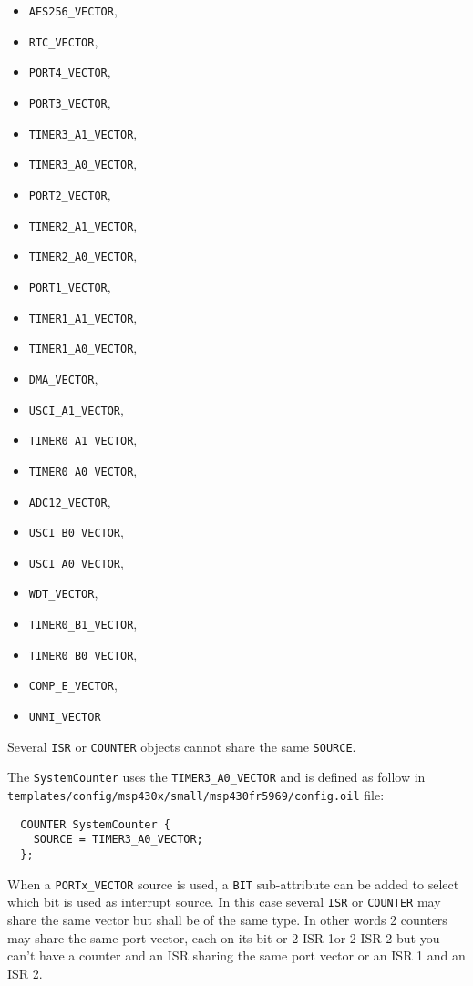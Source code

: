 \documentclass[11pt, oneside]{article}   	%
\begin{document}
\begin{itemize}[noitemsep]
\item \lstinline{AES256_VECTOR},
\item \lstinline{RTC_VECTOR},
\item \lstinline{PORT4_VECTOR},
\item \lstinline{PORT3_VECTOR},
\item \lstinline{TIMER3_A1_VECTOR},
\item \lstinline{TIMER3_A0_VECTOR},
\item \lstinline{PORT2_VECTOR},
\item \lstinline{TIMER2_A1_VECTOR},
\item \lstinline{TIMER2_A0_VECTOR},
\item \lstinline{PORT1_VECTOR},
\item \lstinline{TIMER1_A1_VECTOR},
\item \lstinline{TIMER1_A0_VECTOR},
\item \lstinline{DMA_VECTOR},
\item \lstinline{USCI_A1_VECTOR},
\item \lstinline{TIMER0_A1_VECTOR},
\item \lstinline{TIMER0_A0_VECTOR},
\item \lstinline{ADC12_VECTOR},
\item \lstinline{USCI_B0_VECTOR},
\item \lstinline{USCI_A0_VECTOR},
\item \lstinline{WDT_VECTOR},
\item \lstinline{TIMER0_B1_VECTOR},
\item \lstinline{TIMER0_B0_VECTOR},
\item \lstinline{COMP_E_VECTOR},
\item \lstinline{UNMI_VECTOR}
\end{itemize}

Several \lstinline{ISR} or \lstinline{COUNTER} objects cannot share the same \lstinline{SOURCE}.

The \lstinline{SystemCounter} uses the \lstinline{TIMER3_A0_VECTOR} and is defined as follow in \lstinline[breaklines=true]{templates/config/msp430x/small/msp430fr5969/config.oil} file:

\begin{lstlisting}
  COUNTER SystemCounter {
    SOURCE = TIMER3_A0_VECTOR;
  };
\end{lstlisting}

When a \lstinline{PORTx_VECTOR} source is used, a \lstinline{BIT} sub-attribute can be added to select which bit is used as interrupt source. In this case several \lstinline{ISR} or \lstinline{COUNTER} may share the same vector but shall be of the same type. In other words 2 counters may share the same port vector, each on its bit or 2 ISR 1or 2 ISR 2 but you can't have a counter and an ISR sharing the same port vector or an ISR 1 and an ISR 2.
\end{document}
